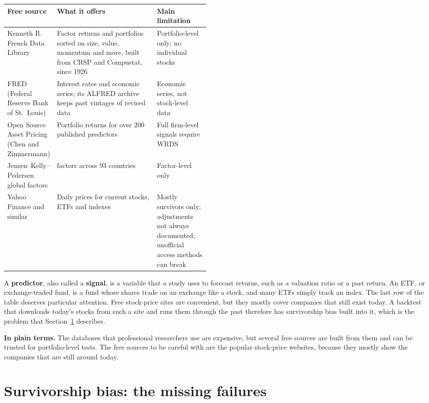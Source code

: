 \begin{center}
\small
\begin{tabularx}{0.9\linewidth}{@{}>{\raggedright\arraybackslash}p{0.22\linewidth}>{\raggedright\arraybackslash}X>{\raggedright\arraybackslash}p{0.26\linewidth}@{}}
\toprule
Free source & What it offers & Main limitation \\
\midrule
Kenneth R. French Data Library & Factor returns and portfolios sorted on size, value, momentum and more, built from CRSP and Compustat, since 1926 & Portfolio-level only; no individual stocks \\
FRED (Federal Reserve Bank of St.\ Louis) & Interest rates and economic series; its ALFRED archive keeps past vintages of revised data & Economic series, not stock-level data \\
Open Source Asset Pricing (Chen and Zimmermann) & Portfolio returns for over 200 published predictors & Full firm-level signals require WRDS \\
Jensen--Kelly--Pedersen global factors & 153 factors across 93 countries & Factor-level only \\
Yahoo Finance and similar & Daily prices for current stocks, ETFs and indexes & Mostly survivors only; adjustments not always documented; unofficial access methods can break \\
\bottomrule
\end{tabularx}
\end{center}

A \textbf{predictor}, also called a \textbf{signal}, is a variable that a study uses to forecast returns, such as a valuation ratio or a past return. An ETF, or exchange-traded fund, is a fund whose shares trade on an exchange like a stock, and many ETFs simply track an index. The last row of the table deserves particular attention. Free stock-price sites are convenient, but they mostly cover companies that still exist today. A backtest that downloads today's stocks from such a site and runs them through the past therefore has survivorship bias built into it, which is the problem that Section~\ref{sec:02-survivorship} describes.

\noindent\textbf{In plain terms.} The databases that professional researchers use are expensive, but several free sources are built from them and can be trusted for portfolio-level tests. The free sources to be careful with are the popular stock-price websites, because they mostly show the companies that are still around today.

\section{Survivorship bias: the missing failures}
\label{sec:02-survivorship}

